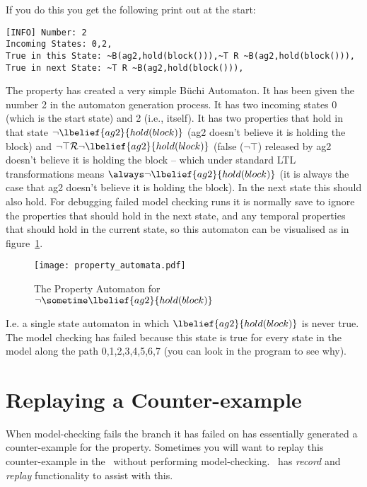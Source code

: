 \documentclass[a4]{article}
\begin{document}
If you do this you get the following print out at the start:

\begin{verbatim}
[INFO] Number: 2
Incoming States: 0,2,
True in this State: ~B(ag2,hold(block())),~T R ~B(ag2,hold(block())),
True in next State: ~T R ~B(ag2,hold(block())),
\end{verbatim}

The property has created a very simple B\"{u}chi Automaton.  It has been given the number 2 in the automaton generation process.  It has two incoming states 0 (which is the start state) and 2 (i.e., itself).  It has two properties that hold in that state $\neg \lbelief{ag2}{hold(block)}$ (ag2 doesn't believe it is holding the block) and $\neg \top {\cal R} \neg \lbelief{ag2}{hold(block)}$ (false ($\neg \top$) released by ag2 doesn't believe it is holding the block -- which under standard LTL transformations means $\always \neg \lbelief{ag2}{hold(block)}$ (it is always the case that ag2 doesn't believe it is holding the block).  In the next state this should also hold.  For debugging failed model checking runs it is normally save to ignore the properties that should hold in the next state, and any temporal properties that should hold in the current state, so this automaton can be visualised as in figure~\ref{fig:automaton}.

\begin{figure}[htb]
\begin{center}
\texttt{[image: property\_automata.pdf]}
\end{center}
\caption{The Property Automaton for $\neg \sometime \lbelief{ag2}{hold(block)}$}
\label{fig:automaton}
\end{figure}

I.e. a single state automaton in which $\lbelief{ag2}{hold(block)}$ is never true.  The model checking has failed because this state is true for every state in the model along the path 0,1,2,3,4,5,6,7 (you can look in the program to see why).

\section{Replaying a Counter-example}
When model-checking fails the branch it has failed on has essentially generated a counter-example for the property.  Sometimes you will want to replay this counter-example in the \ail\ without performing model-checking.  \ajpf\ has \emph{record} and \emph{replay} functionality to assist with this.
\end{document}
